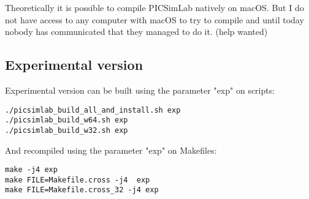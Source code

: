 Theoretically it is possible to compile PICSimLab natively on macOS. But I do not have access to any computer
 with macOS to try to compile and until today nobody has communicated that they managed to do it. (help wanted) 


\subsection{Experimental version}

Experimental version can be built using the parameter "exp" on scripts:
\begin{verbatim}
./picsimlab_build_all_and_install.sh exp
./picsimlab_build_w64.sh exp
./picsimlab_build_w32.sh exp
\end{verbatim}
And recompiled using the parameter "exp" on Makefiles:
\begin{verbatim}
make -j4 exp
make FILE=Makefile.cross -j4  exp
make FILE=Makefile.cross_32 -j4 exp
\end{verbatim}
 
